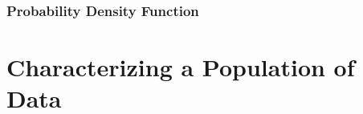 \documentclass[fleqn]{ltx-talk} %
\newcommand{\sectionIItitle}{Characterizing a Population of Data}
\newcommand{\sectionIsubsectionIVtitle}{Probability Density Function}
\begin{document}
%
%
%
%
%				

			\begin{frame}
				\frametitle{\sectionIsubsectionIVtitle}

\bigskip


			\end{frame}

	
	\section{\sectionIItitle}\label{sectionII}
\end{document}
